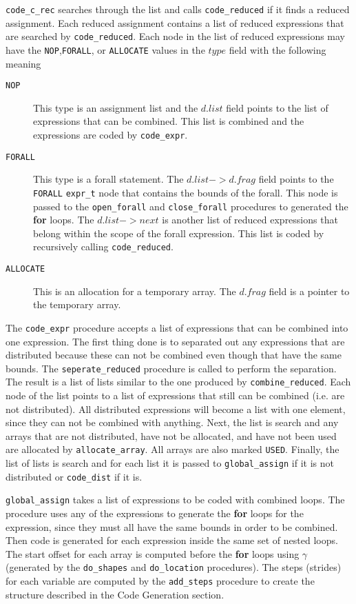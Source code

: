 {\tt code\_c\_rec} searches through the list and calls
{\tt code\_reduced} if it finds a reduced assignment.  Each reduced assignment
contains a list of reduced expressions that are searched by {\tt code\_reduced}.
Each node in the list of reduced expressions may have the {\tt NOP},{\tt FORALL},
 or {\tt ALLOCATE} values in the $type$ field with the following meaning
\begin{description}
\item[{\tt NOP}] This type is an assignment list and the $d.list$ field points
to the list of expressions that can be combined.  This list is combined
and the expressions are coded by {\tt code\_expr}.
\item[{\tt FORALL}] This type is a forall statement.  The $d.list->d.frag$
field points to the {\tt FORALL} {\tt expr\_t} node that contains the bounds of the
forall.  This node is passed to the {\tt open\_forall} and {\tt close\_forall} 
procedures to generated the {\bf for} loops.  The $d.list->next$ is another
list of reduced expressions that belong within the scope of the forall
expression.  This list is coded by recursively calling {\tt code\_reduced}.
\item[{\tt ALLOCATE}]  This is an allocation for a temporary array.  The
$d.frag$ field is a pointer to the temporary array.
\end{description}

The {\tt code\_expr} procedure accepts a list of expressions that can be
combined into one expression.  The first thing done is to separated out
any expressions that are distributed because these can not be combined
even though that have the same bounds.  The {\tt seperate\_reduced} procedure
is called to perform the separation.  The result is a list of lists
similar to the one produced by {\tt combine\_reduced}.  Each node of the list
points to a list of expressions that still can be combined (i.e. are not
distributed).  All distributed expressions will become a list with one element,
since they can not be combined with anything.  Next, the list is search and
any arrays that are not distributed, have not be allocated, and have not been
used are allocated by {\tt allocate\_array}.  All arrays are also marked {\tt USED}.
Finally, the list of lists is search and for each list it is passed to
{\tt global\_assign} if it is not distributed or {\tt code\_dist} if it is.

{\tt global\_assign} takes a list of expressions to be coded with combined loops.
The procedure uses any of the expressions to generate the {\bf for} loops for 
the 
expression, since they must all have the same bounds in order to be combined.
Then code is generated for each expression inside the same set of nested 
loops.  The start offset for each array is computed before the {\bf for}
loops using $\gamma$ (generated by the {\tt do\_shapes} and {\tt do\_location} 
procedures).
The steps (strides) for each variable are computed by the {\tt add\_steps} 
procedure to create the structure described in the Code Generation
section.

